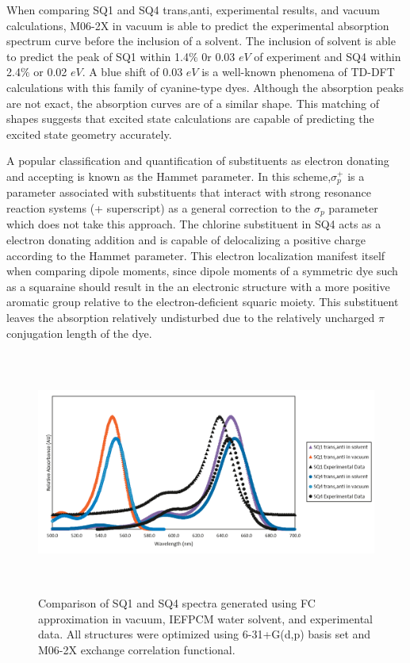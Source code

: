 \documentclass[journal=jacsat,manuscript=article]{achemso}
\begin{document}
When comparing SQ1 and SQ4 trans,anti, experimental results, and vacuum calculations, M06-2X in vacuum is able to predict the experimental absorption spectrum curve before the inclusion of a solvent. The inclusion of solvent is able to predict the peak of SQ1 within 1.4$\%$ 0r 0.03 $eV$ of experiment and SQ4 within 2.4$\%$ or 0.02 $eV$. A blue shift of 0.03 $eV$ is a well-known phenomena of TD-DFT calculations with this family of cyanine-type dyes\cite{Jacquemin2011Excited-stateEnvironments}. Although the absorption peaks are not exact, the absorption curves are of a similar shape. This matching of shapes suggests that excited state calculations are capable of predicting the excited state geometry accurately. 

A popular classification and quantification of substituents as electron donating and accepting is known as the Hammet parameter\cite{Hansch1991AParameters}. In this scheme,$\sigma_{p}^{+}$ is a parameter associated with substituents that interact with strong resonance reaction systems (+ superscript) as a general correction to the $\sigma_{p}$ parameter which does not take this approach. The chlorine substituent in SQ4 acts as a electron donating addition and is capable of delocalizing a positive charge according to the Hammet parameter. This electron localization manifest itself when comparing dipole moments, since dipole moments of a symmetric dye such as a squaraine should result in the an electronic structure with a more positive aromatic group relative to the electron-deficient squaric moiety. This substituent leaves the absorption relatively undisturbed due to the relatively uncharged $\pi$ conjugation length of the dye\cite{Punitharasu2019-ExtendedResponse}.


\begin{figure}[h]
    \centering
    \includegraphics[width=15cm,height=8cm]{figures/sq1-sq4.png}
    \caption{Comparison of  SQ1 and SQ4 spectra generated using FC approximation in vacuum, IEFPCM water solvent, and experimental data. All structures were optimized using 6-31+G(d,p) basis set and M06-2X exchange correlation functional.}
    \label{fig:SQ1 and SQ4}
\end{figure}
\end{document}
